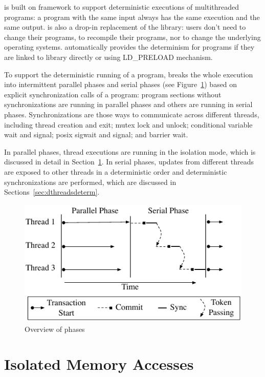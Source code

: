 \Dthreads{} is built on \Sheriff{} framework to support deterministic executions of
multithreaded programs:  a program with the same input always has the same execution and 
the same output.
\Dthreads{} is also a drop-in replacement of the \pthreads{} library:
users don't need to change their programs, 
to recompile their programs, nor to change the underlying operating
systems. \dthreads{} automatically provides the determinism for programs if they are linked to 
\dthreads{} library directly or using LD\_PRELOAD mechanism.

To support the deterministic running of a program, 
\Dthreads{} breaks the whole execution into intermittent parallel phases and serial phases 
(see Figure~\ref{fig:dthreadsphases}) based on explicit synchronization calls of a program: 
program sections without synchronizations are running in parallel 
phases and others are running in serial phases.
Synchronizations are those ways to communicate across different threads, 
including thread creation and exit; mutex lock and unlock; conditional variable wait
and signal; posix sigwait and signal; and barrier wait. 

In parallel phases, thread executions are running in the isolation mode, which is discussed 
in detail in Section~\ref{sec:dthreadsisolation}.
In serial phases, updates from different threads are exposed to other threads 
in a deterministic order and deterministic synchronizations are performed, which are 
discussed in Sections~\ref{sec:dthreadsdeterm}. 

\begin{figure}[b]
{\centering 
\includegraphics{fig/phase-diagram} 
\caption{Overview of \dthreads{} phases
\label{fig:dthreadsphases}}
}
\end{figure}

\section{Isolated Memory Accesses}
\label{sec:dthreadsisolation}


